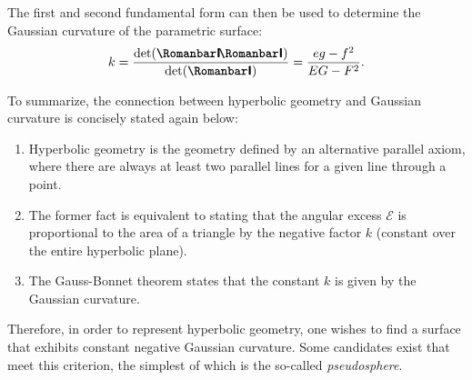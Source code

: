 The first and second fundamental form can then be used to determine the Gaussian curvature of the parametric surface: \cite{ONeill2006, Spivak1999b}
\begin{equation}
    k = \frac{\det(\secondff)}{\det(\firstff)} = \frac{eg - f^2}{EG - F^2}.
    \label{eq:gaussian_curv}
\end{equation}

To summarize, the connection between hyperbolic geometry and Gaussian curvature is concisely stated again below:
\begin{enumerate}[itemsep=0.3ex,topsep=0.3ex]
    \item Hyperbolic geometry is the geometry defined by an alternative parallel axiom, where there are always at least two parallel lines for a given line through a point.
    \item The former fact is equivalent to stating that the angular excess \(\mathscr{E}\) is proportional to the area of a triangle by the negative factor \(k\) (constant over the entire hyperbolic plane).
    \item The Gauss-Bonnet theorem states that the constant \(k\) is given by the Gaussian curvature.
\end{enumerate}
Therefore, in order to represent hyperbolic geometry, one wishes to find a surface that exhibits constant negative Gaussian curvature. Some candidates exist that meet this criterion, the simplest of which is the so-called \emph{pseudosphere}.

